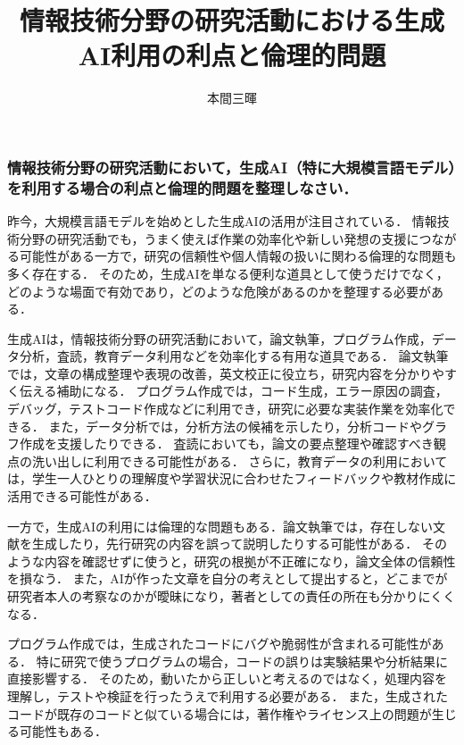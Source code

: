 \documentclass[titlepage,a4paper]{jsarticle}
\title{情報技術分野の研究活動における生成AI利用の利点と倫理的問題}
\author{本間三暉}
\begin{document}
\maketitle
\subsubsection*{情報技術分野の研究活動において，生成AI（特に大規模言語モデル）を利用する場合の利点と倫理的問題を整理しなさい．}
昨今，大規模言語モデルを始めとした生成AIの活用が注目されている．
情報技術分野の研究活動でも，うまく使えば作業の効率化や新しい発想の支援につながる可能性がある一方で，研究の信頼性や個人情報の扱いに関わる倫理的な問題も多く存在する．
そのため，生成AIを単なる便利な道具として使うだけでなく，どのような場面で有効であり，どのような危険があるのかを整理する必要がある．

生成AIは，情報技術分野の研究活動において，論文執筆，プログラム作成，データ分析，査読，教育データ利用などを効率化する有用な道具である．
論文執筆では，文章の構成整理や表現の改善，英文校正に役立ち，研究内容を分かりやすく伝える補助になる．
プログラム作成では，コード生成，エラー原因の調査，デバッグ，テストコード作成などに利用でき，研究に必要な実装作業を効率化できる．
また，データ分析では，分析方法の候補を示したり，分析コードやグラフ作成を支援したりできる．
査読においても，論文の要点整理や確認すべき観点の洗い出しに利用できる可能性がある．
さらに，教育データの利用においては，学生一人ひとりの理解度や学習状況に合わせたフィードバックや教材作成に活用できる可能性がある．

一方で，生成AIの利用には倫理的な問題もある．論文執筆では，存在しない文献を生成したり，先行研究の内容を誤って説明したりする可能性がある．
そのような内容を確認せずに使うと，研究の根拠が不正確になり，論文全体の信頼性を損なう．
また，AIが作った文章を自分の考えとして提出すると，どこまでが研究者本人の考察なのかが曖昧になり，著者としての責任の所在も分かりにくくなる．

プログラム作成では，生成されたコードにバグや脆弱性が含まれる可能性がある．
特に研究で使うプログラムの場合，コードの誤りは実験結果や分析結果に直接影響する．
そのため，動いたから正しいと考えるのではなく，処理内容を理解し，テストや検証を行ったうえで利用する必要がある．
また，生成されたコードが既存のコードと似ている場合には，著作権やライセンス上の問題が生じる可能性もある．
\end{document}
